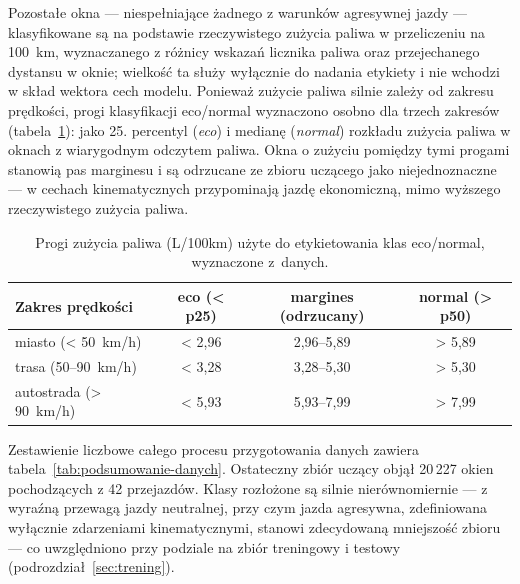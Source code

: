 Pozostałe okna --- niespełniające żadnego z warunków agresywnej jazdy ---
klasyfikowane są na podstawie rzeczywistego zużycia paliwa w przeliczeniu na
100~km, wyznaczanego z różnicy wskazań licznika paliwa oraz przejechanego
dystansu w oknie; wielkość ta służy wyłącznie do nadania etykiety i nie
wchodzi w skład wektora cech modelu. Ponieważ zużycie paliwa silnie zależy od
zakresu prędkości, progi klasyfikacji eco/normal wyznaczono osobno dla trzech
zakresów (tabela~\ref{tab:progi-paliwo}): jako 25. percentyl (\emph{eco})
i medianę (\emph{normal}) rozkładu zużycia paliwa w oknach z wiarygodnym
odczytem paliwa. Okna
o zużyciu pomiędzy tymi progami stanowią pas marginesu i są odrzucane ze
zbioru uczącego jako niejednoznaczne --- w cechach kinematycznych przypominają
jazdę ekonomiczną, mimo wyższego rzeczywistego zużycia paliwa.

\begin{table}[!h]
    \centering
    \caption{Progi zużycia paliwa (L/100km) użyte do etykietowania klas eco/normal, wyznaczone z~danych.}
    \label{tab:progi-paliwo}
    \begin{tabular}{| l | c | c | c |} \hline
        \textbf{Zakres prędkości} & \textbf{eco (< p25)} & \textbf{margines (odrzucany)} & \textbf{normal (> p50)} \\ \hline\hline
        miasto (< 50~km/h)      & < 2,96 & 2,96--5,89 & > 5,89 \\ \hline
        trasa (50--90~km/h)     & < 3,28 & 3,28--5,30 & > 5,30 \\ \hline
        autostrada (> 90~km/h)  & < 5,93 & 5,93--7,99 & > 7,99 \\ \hline
    \end{tabular}
\end{table}

Zestawienie liczbowe całego procesu przygotowania danych zawiera
tabela~\ref{tab:podsumowanie-danych}. Ostateczny zbiór uczący objął 20\,227 okien pochodzących z 42 przejazdów.
Klasy rozłożone są silnie nierównomiernie --- z wyraźną przewagą jazdy
neutralnej, przy czym jazda agresywna, zdefiniowana wyłącznie zdarzeniami
kinematycznymi, stanowi zdecydowaną
mniejszość zbioru --- co uwzględniono przy podziale na zbiór treningowy
i testowy (podrozdział~\ref{sec:trening}).

